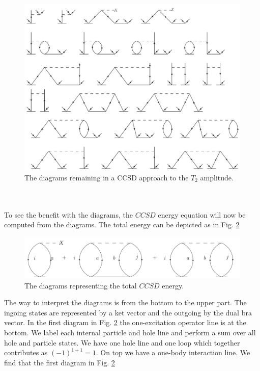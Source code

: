 \begin{figure}[htp]
\centering
\includegraphics[scale=0.5]{t2_eqn_diag2}%
\caption{The diagrams remaining in a CCSD approach to the
$T_2$ amplitude.}
\label{t2_eqn_diag_ccsd}
\end{figure}\\
\\
To see the benefit with the diagrams, the $CCSD$ energy 
equation will now be computed from the diagrams. The total 
energy can be depicted as in Fig. \ref{totenergydi}\\
\begin{figure}[htp]
\centering
\includegraphics[width=1.0\textwidth]{energy}
\caption{The diagrams representing the total $CCSD$ 
energy.}
\label{totenergydi}
\end{figure}
The way to interpret the diagrams is from the bottom to the 
upper part. The ingoing states are 
represented by a ket vector and the outgoing by the dual bra 
vector. In the first diagram in Fig. \ref{totenergydi} the one-excitation operator line is at the bottom. We
label each internal particle and hole line and perform a sum over all hole and particle states. We have one
hole line and one loop which together contributes as $(-1)^{1+1}=1$. On top we have a one-body
interaction line. We find that the first diagram in Fig. \ref{totenergydi} 
